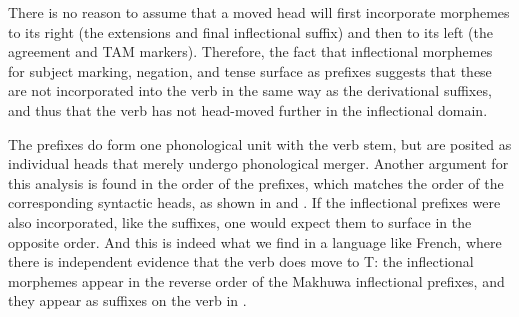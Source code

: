 \documentclass[output=paper
,modfonts
,nonflat]{langsci/langscibook}
\begin{document}

 
\begin{exe}
\end{exe} 

\newpage {}
\newpage There is no reason to assume that a moved head will first incorporate morphemes to its right (the extensions and final inflectional suffix) and then to its left (the agreement and TAM markers). Therefore, the fact that inflectional morphemes for subject marking, negation, and tense surface as prefixes suggests that these are not incorporated into the verb in the same way as the derivational suffixes, and thus that the verb has not head-moved further in the inflectional domain.

The prefixes do form one phonological unit with the verb stem, but are posited as individual heads that merely undergo phonological merger. Another argument for this analysis is found in the order of the prefixes, which matches the order of the corresponding syntactic heads, as shown in  and . If the inflectional prefixes were also incorporated, like the suffixes, one would expect them to surface in the opposite order. And this is indeed what we find in a language like French, where there is independent evidence that the verb does move to T: the inflectional morphemes appear in the reverse order of the Makhuwa inflectional prefixes, and they appear as suffixes on the verb in .
\end{document}
